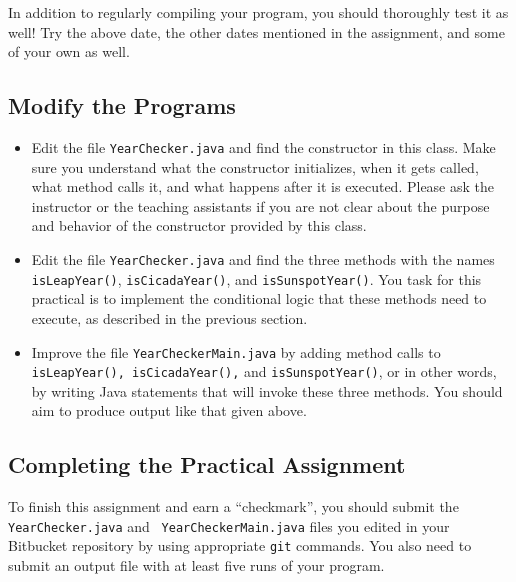 \noindent In addition to regularly compiling your program, you should thoroughly test it as well! Try the above
date, the other dates mentioned in the assignment, and some of your own as well.

\vspace*{-.1in}
\subsection*{Modify the Programs}
\vspace*{-.05in}
\begin{itemize}

\item Edit the file {\tt YearChecker.java} and find the constructor in this class. Make sure you understand what the
  constructor initializes, when it gets called, what method calls it, and what happens after it is executed. Please ask
  the instructor or the teaching assistants if you are not clear about the purpose and behavior of the constructor
  provided by this class.

\item  Edit the file {\tt YearChecker.java} and find the three methods with the names {\tt isLeapYear()}, {\tt isCicadaYear()}, and
  {\tt isSunspotYear()}.  You task for this practical is to implement the conditional logic that these methods need to
  execute, as described in the previous section.

\item \begin{sloppypar} Improve the file {\tt YearCheckerMain.java} by adding method calls to {\tt isLeapYear(),
  isCicadaYear(),} and {\tt isSunspotYear()}, or in other words, by writing Java statements that will invoke these three
methods. You should aim to produce output like that given above. \end{sloppypar}

\end{itemize}

\vspace*{-.25in}
\subsection*{Completing the Practical Assignment}
\vspace*{-.1in}

To finish this assignment and earn a ``checkmark'', you should submit the {\tt YearChecker.java} and {\tt
YearCheckerMain.java} files you edited in your Bitbucket repository by using appropriate {\tt git} commands. You
also need to submit an output file with at least five runs of your program.

